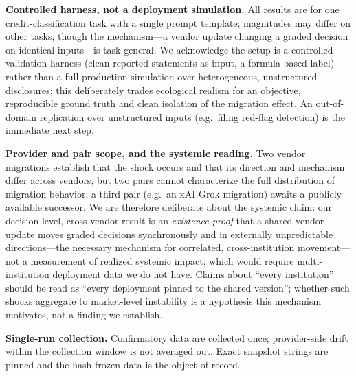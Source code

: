 \documentclass[10pt,twocolumn]{article}
\begin{document}
\noindent\textbf{Controlled harness, not a deployment simulation.} All results are for one credit-classification task with a single prompt template; magnitudes may differ on other tasks, though the mechanism---a vendor update changing a graded decision on identical inputs---is task-general. We acknowledge the setup is a controlled validation harness (clean reported statements as input, a formula-based label) rather than a full production simulation over heterogeneous, unstructured disclosures; this deliberately trades ecological realism for an objective, reproducible ground truth and clean isolation of the migration effect. An out-of-domain replication over unstructured inputs (e.g.\ filing red-flag detection) is the immediate next step.

\noindent\textbf{Provider and pair scope, and the systemic reading.} Two vendor migrations establish that the shock occurs and that its direction and mechanism differ across vendors, but two pairs cannot characterize the full distribution of migration behavior; a third pair (e.g.\ an xAI Grok migration) awaits a publicly available successor. We are therefore deliberate about the systemic claim: our decision-level, cross-vendor result is an \emph{existence proof} that a shared vendor update moves graded decisions synchronously and in externally unpredictable directions---the necessary mechanism for correlated, cross-institution movement---not a measurement of realized systemic impact, which would require multi-institution deployment data we do not have. Claims about ``every institution'' should be read as ``every deployment pinned to the shared version''; whether such shocks aggregate to market-level instability is a hypothesis this mechanism motivates, not a finding we establish.

\noindent\textbf{Single-run collection.} Confirmatory data are collected once; provider-side drift within the collection window is not averaged out. Exact snapshot strings are pinned and the hash-frozen data is the object of record.
\end{document}
